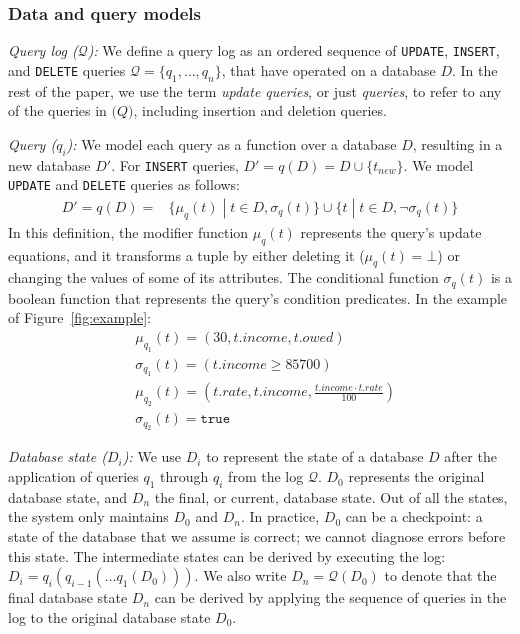 \subsubsection*{Data and query models}
\label{sec:models}

\noindent
\emph{Query log ($\mathcal{Q}$):}
We define a query log as an ordered sequence of \texttt{UPDATE}, \texttt{INSERT}, and
\texttt{DELETE} queries $\mathcal{Q}=\{q_1,\dots,q_n\}$, that have
operated on a database $D$. In the rest of the paper, we use the term
\emph{update queries}, or just \emph{queries}, to refer to any of the queries in $\mathcal(Q)$,
including insertion and deletion queries.

\smallskip
\noindent
\emph{Query ($q_i$):} We model each query as a function over a
database $D$, resulting in a new database $D'$. For \texttt{INSERT}
queries, $D'=q(D)=D\cup\{t_{new}\}$.
We model \texttt{UPDATE} and \texttt{DELETE} queries as follows:  
\begin{align*}
    D'=q(D)= &\{\mu_{q}(t)\;|\;t\in D, \sigma_{q}(t)\}%
    \cup\{t\;|\;t\in D, \neg\sigma_{q}(t)\}%
\end{align*}
% 
In this definition, the modifier function $\mu_q(t)$ represents the query's update equations, and it transforms a tuple by either deleting it ($\mu_q(t)=\bot$) or changing the values of some of its attributes.
The conditional function $\sigma_q(t)$ is a boolean function that represents the query's condition predicates.  In the example of Figure~\ref{fig:example}:
\begin{align*}
    &\mu_{q_1}(t)=(30, t.income, t.owed)\\
    &\sigma_{q_1}(t)=(t.income\ge 85700)\\
    &\mu_{q_2}(t)=(t.rate, t.income, \frac{t.income\cdot t.rate}{100})\\
    &\sigma_{q_2}(t)=\texttt{true}
\end{align*} 
% 


\smallskip
\noindent
\emph{Database state ($D_i$):}
We use $D_i$ to represent the state of a database $D$ after the application of
queries $q_1$ through $q_i$ from the log $\mathcal{Q}$. $D_0$ represents the
original database state, and $D_n$ the final, or current, database state. Out
of all the states, the system only maintains $D_0$ and $D_n$. In practice,
$D_0$ can be a checkpoint: a state of the database that we assume is correct;
we cannot diagnose errors before this state. The intermediate states can be
derived by executing the log: $D_i=q_i(q_{i-1}(\dots q_1(D_0)))$. We also
write $D_n=\mathcal{Q}(D_0)$ to denote that the final database state $D_n$ can
be derived by applying the sequence of queries in the log to the original
database state $D_0$.

